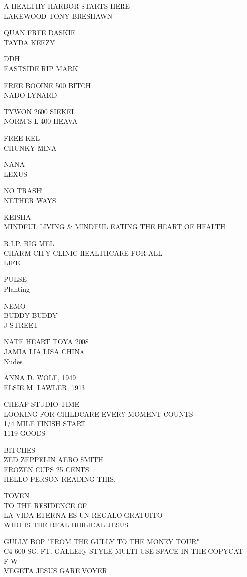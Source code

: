 \documentclass[10pt,letterpaper]{article}
\begin{document}
A HEALTHY HARBOR STARTS HERE\\
LAKEWOOD TONY BRESHAWN

QUAN FREE DASKIE\\
TAYDA KEEZY

DDH\\
EASTSIDE RIP MARK

FREE BOOINE 500 BITCH\\
NADO LYNARD

TYWON 2600 SIEKEL\\
NORM'S L{-}400 HEAVA

FREE KEL\\
CHUNKY MINA

NANA\\
LEXUS

NO TRASH!\\
NETHER WAYS

KEISHA\\
MINDFUL LIVING \& MINDFUL EATING THE HEART OF HEALTH

R.I.P. BIG MEL\\
CHARM CITY CLINIC HEALTHCARE FOR ALL\\
LIFE

PULSE\\
Planting

NEMO\\
BUDDY BUDDY\\
J{-}STREET

NATE HEART TOYA 2008\\
JAMIA LIA LISA CHINA\\
Nudes

ANNA D. WOLF, 1949\\
ELSIE M. LAWLER, 1913

CHEAP STUDIO TIME\\
LOOKING FOR CHILDCARE EVERY MOMENT COUNTS\\
1/4 MILE FINISH START\\
1119 GOODS

BITCHES\\
ZED ZEPPELIN AERO SMITH\\
FROZEN CUPS 25 CENTS\\
HELLO PERSON READING THIS,

TOVEN\\
TO THE RESIDENCE OF\\
LA VIDA ETERNA ES UN REGALO GRATUITO\\
WHO IS THE REAL BIBLICAL JESUS

GULLY BOP "FROM THE GULLY TO THE MONEY TOUR"\\
C4 600 SG. FT. GALLERy{-}STYLE MULTI{-}USE SPACE IN THE COPYCAT\\
F W\\
VEGETA JESUS GARE VOYER
\pagebreak
\end{document}
